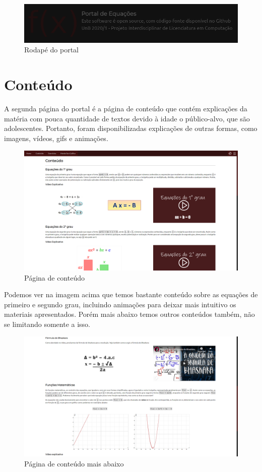 \documentclass[12pt]{report}
\begin{document}
\begin{figure}[H]
    \includegraphics[width=1\textwidth]{img/aplicacao/footer.png}
    \caption{Rodapé do portal}
\end{figure}

\section{Conteúdo}
A segunda página do portal é a página de conteúdo que contém explicações da matéria com pouca quantidade de textos devido à idade o público-alvo, que são adolescentes. Portanto, foram disponibilizadas explicações de outras formas, como imagens, vídeos, gifs e animações.

\begin{figure}[H]
    \includegraphics[width=1\textwidth]{img/aplicacao/conteudo_top.png}
    \caption{Página de conteúdo}
\end{figure}

Podemos ver na imagem acima que temos bastante conteúdo sobre as equações de primeiro e segundo grau, incluindo animações para deixar mais intuitivo os materiais apresentados. Porém mais abaixo temos outros conteúdos também, não se limitando somente a isso.

\begin{figure}[H]
    \includegraphics[width=1\textwidth]{img/aplicacao/conteuro_bottom.png}
    \caption{Página de conteúdo mais abaixo}
    \label{conteudo-bottom}
\end{figure}
\end{document}

